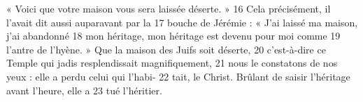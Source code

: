 « Voici que votre maison vous sera laissée déserte. »	 
16	 	Cela précisément, il l'avait dit aussi auparavant par la	 
17	 	bouche de Jérémie : « J'ai laissé ma maison, j'ai abandonné	 
18	 	mon héritage, mon héritage est devenu pour moi comme	 
19	 	l'antre de l'hyène. » Que la maison des Juifs soit déserte,	 
20	 	c'est-à-dire ce Temple qui jadis resplendissait magnifiquement,	 
21	 	nous le constatons de nos yeux : elle a perdu celui qui l'habi-	 
22	 	tait, le Christ. Brûlant de saisir l'héritage avant l'heure, elle a	 
23	 	tué l'héritier.